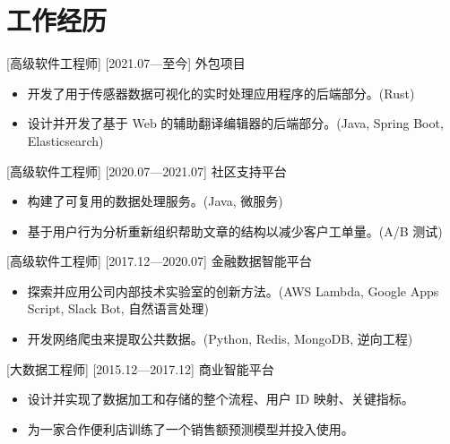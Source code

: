 \documentclass{resume}
\begin{document}


\ResumeTitle

\section{工作经历}
[高级软件工程师]
[2021.07—至今]
外包项目
\begin{itemize}
  \item 开发了用于传感器数据可视化的实时处理应用程序的后端部分。(Rust)
  \item 设计并开发了基于 Web 的辅助翻译编辑器的后端部分。(Java, Spring Boot, Elasticsearch)
\end{itemize}

[高级软件工程师]
[2020.07—2021.07]
社区支持平台
\begin{itemize}
  \item 构建了可复用的数据处理服务。(Java, 微服务)
  \item 基于用户行为分析重新组织帮助文章的结构以减少客户工单量。(A/B 测试)
\end{itemize}

[高级软件工程师]
[2017.12—2020.07]
金融数据智能平台
\begin{itemize}
  \item 探索并应用公司内部技术实验室的创新方法。(AWS Lambda, Google Apps Script, Slack Bot, 自然语言处理)
  \item 开发网络爬虫来提取公共数据。(Python, Redis, MongoDB, 逆向工程)
\end{itemize}

[大数据工程师]
[2015.12—2017.12]
商业智能平台
\begin{itemize}
  \item 设计并实现了数据加工和存储的整个流程、用户 ID 映射、关键指标。
  \item 为一家合作便利店训练了一个销售额预测模型并投入使用。
\end{itemize}
\end{document}
